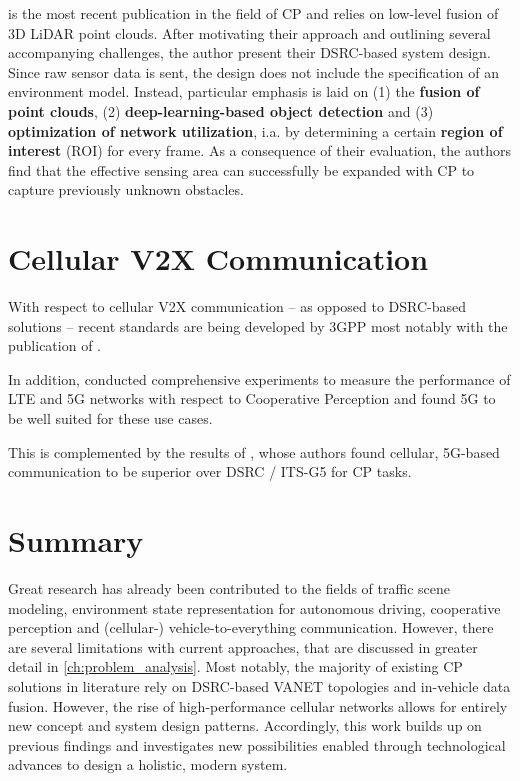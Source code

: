 \cite{Chen2019} is the most recent publication in the field of CP and relies on low-level fusion of 3D LiDAR point clouds. After motivating their approach and outlining several accompanying challenges, the author present their DSRC-based system design. Since raw sensor data is sent, the design does not include the specification of an environment model. Instead, particular emphasis is laid on (1) the \textbf{fusion of point clouds}, (2)\textbf{ deep-learning-based object detection} and (3) \textbf{optimization of network utilization}, i.a. by determining a certain \textbf{region of interest} (ROI) for every frame. As a consequence of their evaluation, the authors find that the effective sensing area can successfully be expanded with CP to capture previously unknown obstacles. 

\section{Cellular V2X Communication}
\label{sec:related_work:cellular_v2x_communication}
With respect to cellular V2X communication – as opposed to DSRC-based solutions – recent standards are being developed by 3GPP most notably with the publication of \cite{3GPP2019}.

In addition, \cite{QualcommTechnologiesInc.2018} conducted comprehensive experiments to measure the performance of LTE and 5G networks with respect to Cooperative Perception and found 5G to be well suited for these use cases. 

This is complemented by the results of \cite{5GAutomotiveAssociation2016}, whose authors found cellular, 5G-based communication to be superior over DSRC / ITS-G5 for CP tasks.

\section{Summary}
\label{sec:related_work:summary}
Great research has already been contributed to the fields of traffic scene modeling, environment state representation for autonomous driving, cooperative perception and (cellular-) vehicle-to-everything communication. However, there are several limitations with current approaches, that are discussed in greater detail in \autoref{ch:problem_analysis}. Most notably, the majority of existing CP solutions in literature rely on DSRC-based VANET topologies and in-vehicle data fusion. However, the rise of high-performance cellular networks allows for entirely new concept and system design patterns. Accordingly, this work builds up on previous findings and investigates new possibilities enabled through technological advances to design a holistic, modern system. 